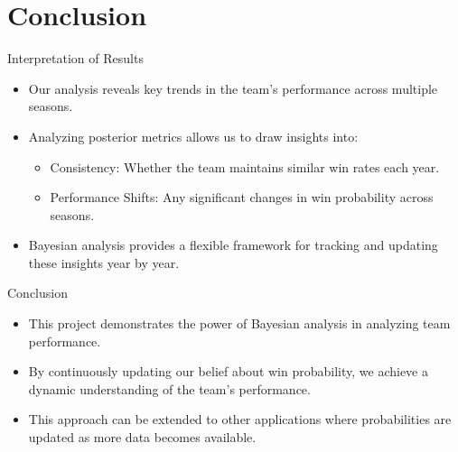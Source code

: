 \section{Conclusion}

\begin{frame}{Interpretation of Results}

  \begin{itemize}
    \item Our analysis reveals key trends in the team’s performance across multiple seasons.
    \item Analyzing posterior metrics allows us to draw insights into:
    \begin{itemize}
        \item Consistency: Whether the team maintains similar win rates each year.
        \item Performance Shifts: Any significant changes in win probability across seasons.
    \end{itemize}
    \item Bayesian analysis provides a flexible framework for tracking and updating these insights year by year.
  \end{itemize}
  
\end{frame}

\begin{frame}{Conclusion}

  \begin{itemize}
    \item This project demonstrates the power of Bayesian analysis in analyzing team performance.
    \item By continuously updating our belief about win probability, we achieve a dynamic understanding of the team’s performance.
    \item This approach can be extended to other applications where probabilities are updated as more data becomes available.
  \end{itemize}
  
\end{frame}